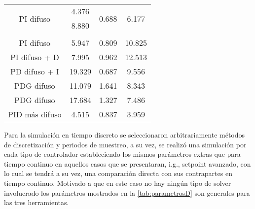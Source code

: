 {\begin{longtable}{c @{\extracolsep{\fill}} ccc}
            \multirow{2}{*}{PI difuso}   & 4.376  & \multirow{2}{*}{0.688} & \multirow{2}{*}{6.177} \\
                                        & 8.880  &                        &                        \\
                                        &        &                        &                        \\[-3pt]
            PI difuso                    & 5.947  &         0.809          &        10.825          \\
            PI difuso + D                & 7.995  &         0.962          &        12.513          \\
            PD difuso + I                & 19.329 &         0.687          &        9.556           \\
            PDG difuso                   & 11.079 &         1.641          &        8.343           \\
            PDG difuso                   & 17.684 &         1.327          &        7.486           \\
            PID más difuso               & 4.515  &         0.837          &        3.959           \\
        \end{longtable}}

        Para la simulación en tiempo discreto se seleccionaron arbitrariamente métodos de discretización y periodos de muestreo, a su vez, se realizó una simulación por cada tipo de controlador estableciendo los mismos parámetros extras que para tiempo continuo en aquellos casos que se presentaran, i.g., setpoint avanzado, con lo cual se tendrá a su vez, una comparación directa con sus contrapartes en tiempo continuo. Motivado a que en este caso no hay ningún tipo de solver involucrado los parámetros mostrados en la \cref{tab:parametrosD} son generales para las tres herramientas.

